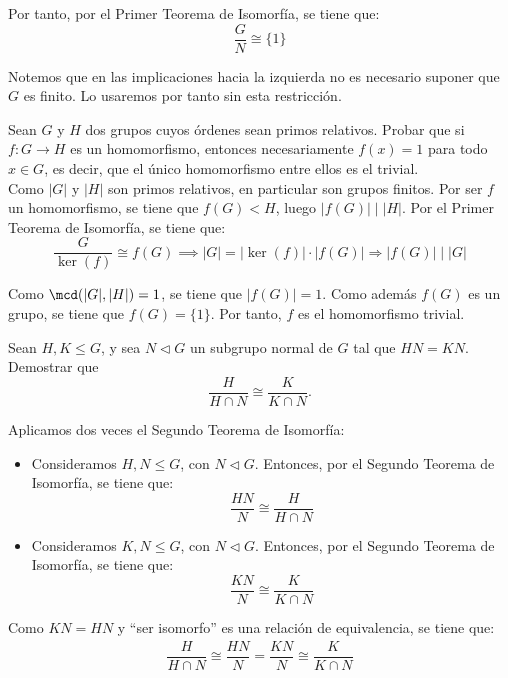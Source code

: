 \begin{ejercicio}
\begin{description}
        Por tanto, por el Primer Teorema de Isomorfía, se tiene que:
        \begin{equation*}
            \dfrac{G}{N}\cong \{1\}
        \end{equation*}
    \end{description}
    \begin{observacion}
        Notemos que en las implicaciones hacia la izquierda no es necesario suponer que $G$ es finito. Lo usaremos por tanto sin esta restricción.
    \end{observacion}
\end{ejercicio}

\begin{ejercicio}
    Sean $G$ y $H$ dos grupos cuyos órdenes sean primos relativos. Probar que si $f:G\to H$ es un homomorfismo, entonces necesariamente $f(x)=1$ para todo $x\in G$, es decir, que el único homomorfismo entre ellos es el trivial.\\

    Como $|G|$ y $|H|$ son primos relativos, en particular son grupos finitos.    Por ser $f$ un homomorfismo, se tiene que $f(G)<H$, luego $|f(G)|\mid |H|$. Por el Primer Teorema de Isomorfía, se tiene que:
    \begin{equation*}
        \dfrac{G}{\ker(f)}\cong f(G) \implies |G| = |\ker(f)|\cdot |f(G)|\Longrightarrow |f(G)|\mid |G|
    \end{equation*}

    Como $\mcd(|G|,|H|)=1$, se tiene que $|f(G)|=1$. Como además $f(G)$ es un grupo, se tiene que $f(G)=\{1\}$. Por tanto, $f$ es el homomorfismo trivial.
\end{ejercicio}

\begin{ejercicio}
    Sean $H,K\leq G$, y sea $N\lhd G$ un subgrupo normal de $G$ tal que $HN=KN$. Demostrar que
    \[
        \frac{H}{H\cap N}\cong \frac{K}{K\cap N}.
    \]

    Aplicamos dos veces el Segundo Teorema de Isomorfía:
    \begin{itemize}
        \item Consideramos $H,N\leq G$, con $N\lhd G$. Entonces, por el Segundo Teorema de Isomorfía, se tiene que:
        \begin{equation*}
            \dfrac{HN}{N} \cong \dfrac{H}{H\cap N}
        \end{equation*}
        \item Consideramos $K,N\leq G$, con $N\lhd G$. Entonces, por el Segundo Teorema de Isomorfía, se tiene que:
        \begin{equation*}
            \dfrac{KN}{N} \cong \dfrac{K}{K\cap N}
        \end{equation*}
    \end{itemize}

    Como $KN=HN$ y ``ser isomorfo'' es una relación de equivalencia, se tiene que:
    \begin{align*}
        \dfrac{H}{H\cap N} \cong \dfrac{HN}{N} = \dfrac{KN}{N} \cong \dfrac{K}{K\cap N}
    \end{align*}
\end{ejercicio}

